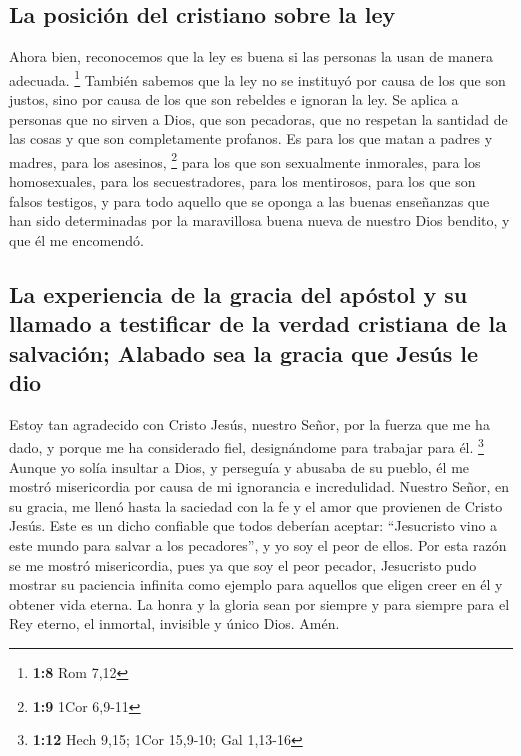 \hypertarget{la-posiciuxf3n-del-cristiano-sobre-la-ley}{%
\subsection{La posición del cristiano sobre la
ley}\label{la-posiciuxf3n-del-cristiano-sobre-la-ley}}

 Ahora bien, reconocemos que la ley es buena si las
personas la usan de manera adecuada. \footnote{\textbf{1:8} Rom 7,12}
 También sabemos que la ley no se instituyó por causa de
los que son justos, sino por causa de los que son rebeldes e ignoran la
ley. Se aplica a personas que no sirven a Dios, que son pecadoras, que
no respetan la santidad de las cosas y que son completamente profanos.
Es para los que matan a padres y madres, para los asesinos, \footnote{\textbf{1:9}
  1Cor 6,9-11}  para los que son sexualmente inmorales,
para los homosexuales, para los secuestradores, para los mentirosos,
para los que son falsos testigos, y para todo aquello que se oponga a
las buenas enseñanzas  que han sido determinadas por la
maravillosa buena nueva de nuestro Dios bendito, y que él me encomendó.

\hypertarget{la-experiencia-de-la-gracia-del-apuxf3stol-y-su-llamado-a-testificar-de-la-verdad-cristiana-de-la-salvaciuxf3n-alabado-sea-la-gracia-que-jesuxfas-le-dio}{%
\subsection{La experiencia de la gracia del apóstol y su llamado a
testificar de la verdad cristiana de la salvación; Alabado sea la gracia
que Jesús le
dio}\label{la-experiencia-de-la-gracia-del-apuxf3stol-y-su-llamado-a-testificar-de-la-verdad-cristiana-de-la-salvaciuxf3n-alabado-sea-la-gracia-que-jesuxfas-le-dio}}

 Estoy tan agradecido con Cristo Jesús, nuestro Señor,
por la fuerza que me ha dado, y porque me ha considerado fiel,
designándome para trabajar para él. \footnote{\textbf{1:12} Hech 9,15;
  1Cor 15,9-10; Gal 1,13-16}  Aunque yo solía insultar a
Dios, y perseguía y abusaba de su pueblo, él me mostró misericordia por
causa de mi ignorancia e incredulidad.  Nuestro Señor, en
su gracia, me llenó hasta la saciedad con la fe y el amor que provienen
de Cristo Jesús.  Este es un dicho confiable que todos
deberían aceptar: ``Jesucristo vino a este mundo para salvar a los
pecadores'', y yo soy el peor de ellos.  Por esta razón
se me mostró misericordia, pues ya que soy el peor pecador, Jesucristo
pudo mostrar su paciencia infinita como ejemplo para aquellos que eligen
creer en él y obtener vida eterna.  La honra y la gloria
sean por siempre y para siempre para el Rey eterno, el inmortal,
invisible y único Dios. Amén.

